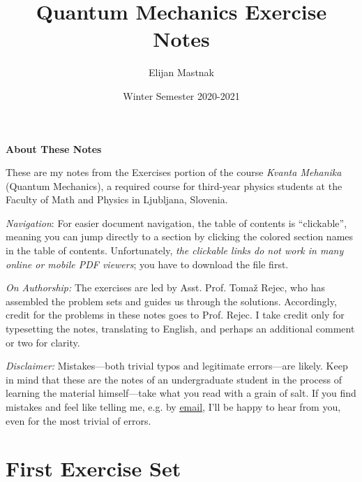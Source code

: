 \documentclass[11pt, a4paper]{article}
\begin{document}
\title{Quantum Mechanics Exercise Notes}
\author{Elijan Mastnak}
\date{Winter Semester 2020-2021}
\maketitle

\thispagestyle{empty}  %

\begin{center}
\textbf{About These Notes}
\end{center}

These are my notes from the Exercises portion of the course \textit{Kvanta Mehanika} (Quantum Mechanics), a required course for third-year physics students at the Faculty of Math and Physics in Ljubljana, Slovenia. 

\vspace{2mm}
\textit{Navigation}: For easier document navigation, the table of contents is ``clickable'', meaning you can jump directly to a section by clicking the colored section names in the table of contents. Unfortunately, \textit{the clickable links do not work in many online or mobile PDF viewers}; you have to download the file first.

\vspace{2mm}
\textit{On Authorship:} 
The exercises are led by Asst. Prof. Toma\v{z} Rejec, who has assembled the problem sets and guides us through the solutions. Accordingly, credit for the problems in these notes goes to Prof. Rejec. I take credit only for typesetting the notes, translating to English, and perhaps an additional comment or two for clarity.

\vspace{2mm}
\textit{Disclaimer:} Mistakes---both trivial typos and legitimate errors---are likely. Keep in mind that these are the notes of an undergraduate student in the process of learning the material himself---take what you read with a grain of salt. If you find mistakes and feel like telling me, e.g. by \href{mailto:ejmastnak@gmail.com}{\underline{email}}, I'll be happy to hear from you, even for the most trivial of errors.

\newpage

\pagestyle{empty}  %

\tableofcontents

\newpage

\pagestyle{fancy}
\section{First Exercise Set}
\end{document}
